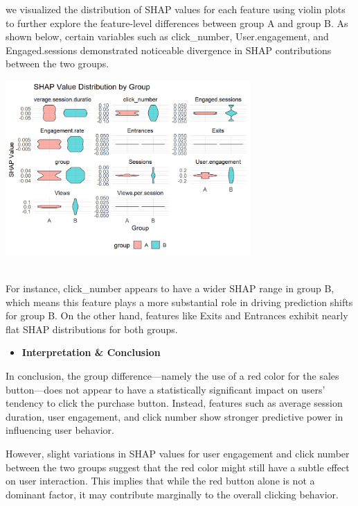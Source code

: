 \documentclass[
  letterpaper,
  DIV=11,
  numbers=noendperiod]{scrartcl}
\providecommand{\tightlist}{%
  \setlength{\itemsep}{0pt}\setlength{\parskip}{0pt}}\usepackage{longtable,booktabs,array}
\begin{document}
we visualized the distribution of SHAP values for each feature using
violin plots to further explore the feature-level differences between
group A and group B. As shown below, certain variables such as
click\_number, User.engagement, and Engaged.sessions demonstrated
noticeable divergence in SHAP contributions between the two groups.\\
\begin{center}
\includegraphics[width=0.7\textwidth,height=\textheight]{data_ana_pj3_files/figure-html/unnamed-chunk-12-1.png}
\end{center}
\\
For instance, click\_number appears to have a wider SHAP range in group
B, which means this feature plays a more substantial role in driving
prediction shifts for group B. On the other hand, features like Exits
and Entrances exhibit nearly flat SHAP distributions for both groups.

\begin{itemize}
\tightlist
\item
  \textbf{Interpretation \& Conclusion}
\end{itemize}

In conclusion, the group difference---namely the use of a red color for
the sales button---does not appear to have a statistically significant
impact on users' tendency to click the purchase button. Instead,
features such as average session duration, user engagement, and click
number show stronger predictive power in influencing user behavior.

However, slight variations in SHAP values for user engagement and click
number between the two groups suggest that the red color might still
have a subtle effect on user interaction. This implies that while the
red button alone is not a dominant factor, it may contribute marginally
to the overall clicking behavior.\\
\end{document}
